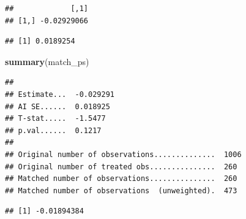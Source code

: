 \documentclass[
]{article}
\newenvironment{Shaded}{\begin{snugshade}}{\end{snugshade}}
\newcommand{\CommentTok}[1]{\textcolor[rgb]{0.56,0.35,0.01}{\textit{#1}}}
\newcommand{\DecValTok}[1]{\textcolor[rgb]{0.00,0.00,0.81}{#1}}
\newcommand{\FunctionTok}[1]{\textcolor[rgb]{0.13,0.29,0.53}{\textbf{#1}}}
\newcommand{\NormalTok}[1]{#1}
\newcommand{\SpecialCharTok}[1]{\textcolor[rgb]{0.81,0.36,0.00}{\textbf{#1}}}
\begin{document}
\begin{verbatim}
##             [,1]
## [1,] -0.02929066
\end{verbatim}

\begin{Shaded}
\end{Shaded}

\begin{verbatim}
## [1] 0.0189254
\end{verbatim}

\begin{Shaded}
\begin{Highlighting}[]
\FunctionTok{summary}\NormalTok{(match\_ps)}
\end{Highlighting}
\end{Shaded}

\begin{verbatim}
## 
## Estimate...  -0.029291 
## AI SE......  0.018925 
## T-stat.....  -1.5477 
## p.val......  0.1217 
## 
## Original number of observations..............  1006 
## Original number of treated obs...............  260 
## Matched number of observations...............  260 
## Matched number of observations  (unweighted).  473
\end{verbatim}

\begin{Shaded}
\end{Shaded}

\begin{verbatim}
## [1] -0.01894384
\end{verbatim}
\end{document}
